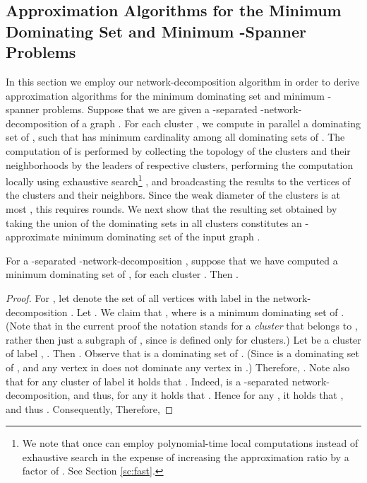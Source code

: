 \documentclass[11pt]{article}
\begin{document}
\subsection{Approximation Algorithms for the Minimum Dominating Set and Minimum -Spanner Problems}
In this section we employ our network-decomposition algorithm in order to derive approximation algorithms for the minimum dominating set and minimum -spanner problems.
Suppose that we are given a -separated -network-decomposition  of a graph . For each cluster , we compute in parallel a dominating set  of , such that  has minimum cardinality among all dominating sets  of . The computation of  is performed by collecting the topology of the clusters and their neighborhoods by the leaders of respective clusters, performing the computation locally using exhaustive search\footnote[1]{We note that once can employ polynomial-time local computations instead of exhaustive search in the expense of increasing the approximation ratio by a factor of . See Section \ref{sc:fast}.} , and broadcasting the results to the vertices of the clusters and their neighbors. Since the weak diameter of the clusters is at most , this requires  rounds. We next show that the resulting set obtained by taking the union of the dominating sets in all clusters constitutes an -approximate minimum dominating set of the input graph .
\begin{lem} \label{dset}
For a -separated -network-decomposition , suppose that we have computed a minimum dominating set  of , for each cluster . Then .
\end{lem}
\begin{proof}
For , let  denote the set of all vertices with label  in the network-decomposition . Let . We claim that ,
where  is a minimum dominating set of . (Note that in the current proof the notation  stands for a {\em cluster}  that belongs to , rather then just a subgraph of , since  is defined only for clusters.) 
Let  be a cluster of label , . 
Then . Observe that  is a dominating set of . (Since  is a dominating set of , and any vertex in  does not dominate any vertex in .) Therefore, . Note also that for any cluster  of label  it holds that . Indeed,  is a -separated network-decomposition, and thus, for any  it holds that . Hence for any , it holds that , and thus . Consequently,  
Therefore,

\end{proof}
\end{document}
